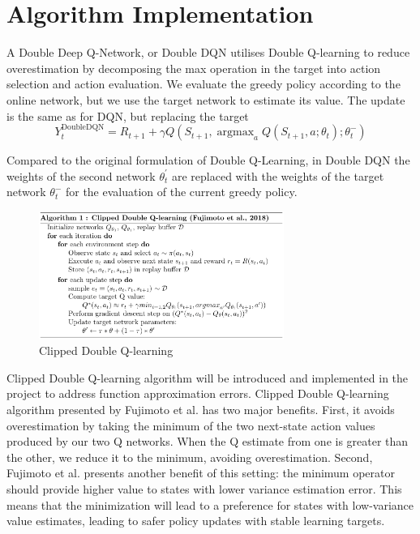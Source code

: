 \documentclass{article}
\DeclareMathOperator*{\argmax}{argmax}
\begin{document}
\section{Algorithm Implementation}



A Double Deep Q-Network, or Double DQN utilises Double Q-learning to reduce
overestimation by decomposing the max operation in the target into action
selection and action evaluation. We evaluate the greedy policy according to the
online network, but we use the target network to estimate its value. The update
is the same as for DQN, but replacing the target
\[
    Y_{t}^{\text{DoubleDQN}} = R_{t+1} + \gamma Q(S_{t+1}, \argmax_a Q(S_{t+1},
    a; \theta _{t});\theta _{t}^{-})
\]

Compared to the original formulation of Double Q-Learning, in Double DQN the
weights of the second network $\theta _{t}^{'}$ are replaced with the weights of
the target network $\theta_{t}^{-}$ for the evaluation of the current greedy
policy.

\begin{figure}[!htbp]
    \begin{center}
    \includegraphics[width=8cm]{alg1_ClippedDDQ_Fujimoto.png}
    \end{center}
    \caption{Clipped Double Q-learning}
    \label{fig:numcomments}
\end{figure}

Clipped Double Q-learning algorithm will be introduced and implemented in the
project to address function approximation errors. Clipped Double Q-learning
algorithm presented by Fujimoto et al. has two major benefits. First, it avoids
overestimation by taking the minimum of the two next-state action values
produced by our two Q networks. When the Q estimate from one is greater than the
other, we reduce it to the minimum, avoiding overestimation. Second, Fujimoto et
al. presents another benefit of this setting: the minimum operator should
provide higher value to states with lower variance estimation error.  This means
that the minimization will lead to a preference for states with low-variance
value estimates, leading to safer policy updates with stable learning targets.


\end{document}
